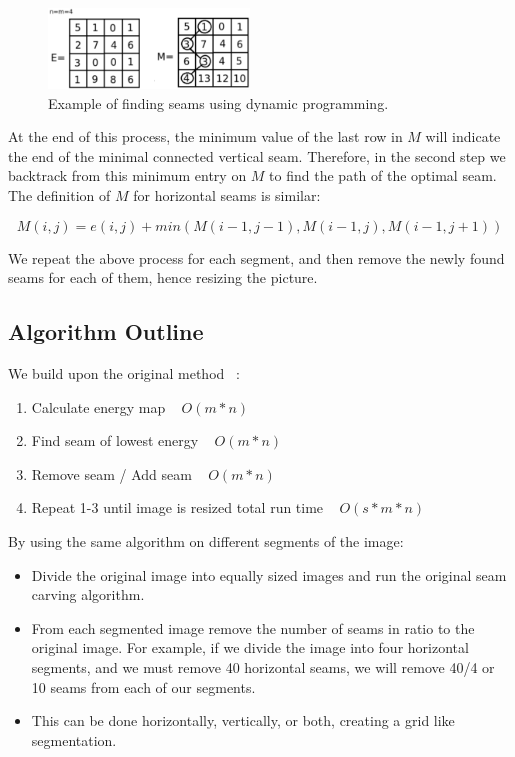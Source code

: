 \documentclass[conference]{acmsiggraph}
\begin{document}
\begin{figure}[ht]
  \centering
  \includegraphics[width=2.1in]{images/seam_alg}
  \caption{ Example of finding seams using dynamic programming.}
  \label{fig:seamAlg}
\end{figure}


At the end of this process, the minimum value of the last row in $M$ will indicate the end of the minimal connected vertical seam. Therefore, in the second step we backtrack from this minimum entry on $M$ to find the path of the optimal seam. The definition of $M$ for horizontal seams is similar:

\begin{equation}
M(i,j) = e(i,j) + min( M(i-1,j-1), M(i-1,j), M(i-1,j+1) )
\end{equation}

We repeat the above process for each segment, and then remove the newly found seams for each of them, hence resizing the picture.

\subsection{Algorithm Outline}

We build upon the original method ~\cite{Avidan2007}:
\begin{enumerate}
  \item Calculate energy map ~ $O(m*n)$
  \item Find seam of lowest energy ~ $O(m*n)$
  \item Remove seam / Add seam ~ $O(m*n)$
  \item Repeat 1-3 until image is resized total run time ~ $O(s*m*n)$ 
\end{enumerate}

By using the same algorithm on different segments of the image:

\begin{itemize}
  \item Divide the original image into equally sized images and run the original seam carving algorithm.
  \item From each segmented image remove the number of seams in ratio to the original image.  For example, if we divide the image into four horizontal segments, and we must remove 40 horizontal seams, we will remove 40/4 or 10 seams from each of our segments.  
  \item This can be done horizontally, vertically, or both, creating a grid like segmentation.
\end{itemize}
\end{document}
